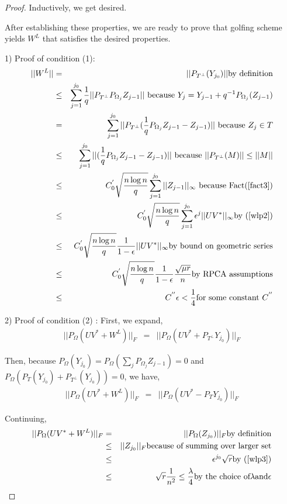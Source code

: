 \begin{proof}
Inductively, we get desired.

After establishing these properties, we are ready to prove that golfing scheme yields $W^{L}$ that satisfies the desired properties.

1) Proof of condition (1):
\begin{eqnarray*}
||W^{L}|| & = & ||P_{T^{\bot}}(Y_{j_{0}})|| \text{by definition}\\
 & \le & \sum_{j=1}^{j_{0}}\frac{1}{q}||P_{T^{\bot}}P_{\Omega_{j}}Z_{j-1}||\text{ because }Y_{j}=Y_{j-1}+q^{-1}P_{\Omega_{j}}(Z_{j-1})\\
 & = & \sum_{j=1}^{j_{0}}||P_{T^{\bot}}(\frac{1}{q}P_{\Omega_{j}}Z_{j-1}-Z_{j-1})||\text{ because }Z_{j}\in T\\
 & \le & \sum_{j=1}^{j_{0}}||(\frac{1}{q}P_{\Omega_{j}}Z_{j-1}-Z_{j-1})||\text{ because }||P_{T^{\bot}}(M)||\le||M||\\
 & \le & C_{0}^{'}\sqrt{\frac{n\log n}{q}}\sum_{j=1}^{j_{0}}||Z_{j-1}||_{\infty}\text{ because Fact(\ref{fact3})}\\
 & \le & C_{0}^{'}\sqrt{\frac{n\log n}{q}}\sum_{j=1}^{j_{0}}\epsilon^{j}||UV^{*}||_{\infty} \text{by (\ref{wlp2})}\\
 & \le & C_{0}^{'}\sqrt{\frac{n\log n}{q}}\frac{1}{1-\epsilon}||UV^{*}||_{\infty} \text{by bound on geometric series}\\
 & \le & C_{0}^{'}\sqrt{\frac{n\log n}{q}}\frac{1}{1-\epsilon}\frac{\sqrt{\mu r}}{n}\text{by RPCA assumptions}\\
 & \le & C^{''}\epsilon<\frac{1}{4}\text{for some constant }C^{''}
\end{eqnarray*}


2) Proof of condition (2) : First, we expand,
\begin{eqnarray*}
||P_{\Omega}(UV^{*}+W^{L})||_{F} & = & ||P_{\Omega}(UV^{*}+P_{T^{\bot}}Y_{j_{0}})||_{F}
\end{eqnarray*}

Then, because $P_{\Omega}(Y_{j_{0}})=P_{\Omega}(\sum_{j}P_{\Omega_{j}}Z_{j-1})=0$ and $P_{\Omega}(P_{T}(Y_{j_{0}})+P_{T^{\bot}}(Y_{j_{0}}))=0$, we have,
\begin{eqnarray*}
||P_{\Omega}(UV^{*}+W^{L})||_{F} & = & ||P_{\Omega}(UV^{*}-P_{T}Y_{j_{0}})||_{F}
\end{eqnarray*}


Continuing,
\begin{eqnarray*}
||P_{\Omega}(UV^{*}+W^{L})||_{F} & = & ||P_{\Omega}(Z_{j_{0}})||_{F} \text{by definition}\\
 & \le & ||Z_{j_{0}}||_{F} \text{because of summing over larger set} \\
 & \le & \epsilon^{j_{0}}\sqrt{r} \text{by (\ref{wlp3})} \\
 & \le & \sqrt{r}\frac{1}{n^{2}}\le\frac{\lambda}{4} \text{by the choice of} \lambda \text{and} \epsilon
\end{eqnarray*}



\end{proof}
